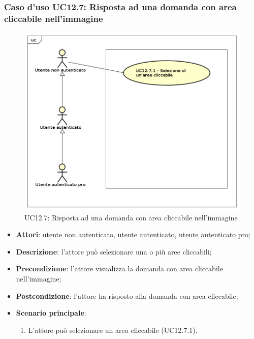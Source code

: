 \subsubsection{Caso d'uso UC12.7: Risposta ad una domanda con area cliccabile nell'immagine}
\label{UC12.7}
\begin{figure}[h]
	\centering
	\includegraphics[scale=0.5]{UML/UC12_7.png}
	\caption{UC12.7: Risposta ad una domanda con area cliccabile nell'immagine}
\end{figure}
\begin{itemize}
\item \textbf{Attori}: utente non autenticato, utente autenticato, utente autenticato pro;
\item \textbf{Descrizione}: l'attore può selezionare una o più aree cliccabili;
\item \textbf{Precondizione}: l'attore visualizza la domanda con area cliccabile nell'immagine;
\item \textbf{Postcondizione}: l'attore ha risposto alla domanda con area cliccabile;
\item \textbf{Scenario principale}: 
\begin{enumerate}
\item L'attore può selezionare un area cliccabile (UC12.7.1).
\end{enumerate}
\end{itemize}

